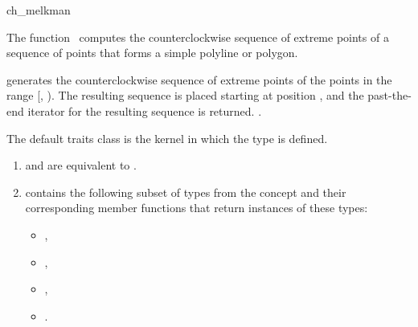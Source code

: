 

\begin{ccRefFunction}{ch_melkman}  %

\ccDefinition
  
The function \ccRefName\ computes the counterclockwise sequence of
extreme points of a sequence of points that forms a simple polyline or polygon.


            {generates the counterclockwise sequence of extreme points
            of the points in the range [, ). 
            The resulting sequence is placed starting at
            position , and the past-the-end iterator for
            the resulting sequence is returned.
            \ccPrecond{ %
            The source range [\ccc{first},\ccc{beyond}) corresponds 
            to a simple polyline. 
            [\ccc{first},\ccc{beyond}) does not contain \ccc{result}}.}

The default traits class  is the kernel in which the
type  is defined.


\begin{enumerate}
   \item    {} and 
            are equivalent to .
   \item    {} contains the following subset of types from
            the concept  and their corresponding member
            functions that return instances of these types:
            \begin{itemize}
                \item {},
		\item {},
                \item {}, 
                \item {}.
            \end{itemize}
\end{enumerate}


\end{ccRefFunction}
